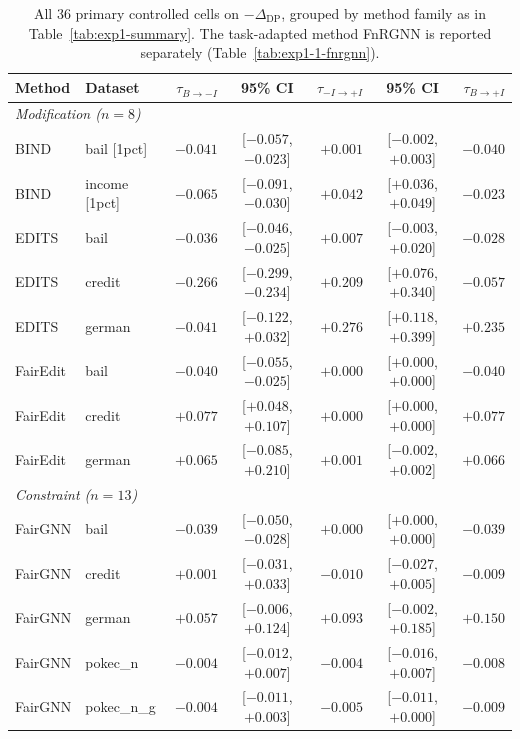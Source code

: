 \begin{table}[t]
\centering
\caption{All 36 primary controlled cells on $-\Delta_{\mathrm{DP}}$, grouped by method family as in Table~\ref{tab:exp1-summary}. The task-adapted method FnRGNN is reported separately (Table~\ref{tab:exp1-1-fnrgnn}).}
\label{tab:exp1-cells-negDP}
\scriptsize
\vspace{-0.2cm}
\begin{tabular}{llrcrcr}
\toprule
Method & Dataset & $\tau_{B\rightarrow -I}$ & 95\% CI & $\tau_{-I\rightarrow +I}$ & 95\% CI & $\tau_{B\rightarrow +I}$ \\
\midrule
\multicolumn{7}{l}{\textit{Modification ($n=8$)}} \\
BIND & bail [1pct] & $-0.041$ & [$-0.057$, $-0.023$] & $+0.001$ & [$-0.002$, $+0.003$] & $-0.040$ \\
BIND & income [1pct] & $-0.065$ & [$-0.091$, $-0.030$] & $\mathbf{+0.042}$ & [$+0.036$, $+0.049$] & $-0.023$ \\
\midrule
EDITS & bail & $-0.036$ & [$-0.046$, $-0.025$] & $+0.007$ & [$-0.003$, $+0.020$] & $-0.028$ \\
EDITS & credit & $-0.266$ & [$-0.299$, $-0.234$] & $\mathbf{+0.209}$ & [$+0.076$, $+0.340$] & $-0.057$ \\
EDITS & german & $-0.041$ & [$-0.122$, $+0.032$] & $\mathbf{+0.276}$ & [$+0.118$, $+0.399$] & $+0.235$ \\
\midrule
FairEdit & bail & $-0.040$ & [$-0.055$, $-0.025$] & $+0.000$ & [$+0.000$, $+0.000$] & $-0.040$ \\
FairEdit & credit & $+0.077$ & [$+0.048$, $+0.107$] & $+0.000$ & [$+0.000$, $+0.000$] & $+0.077$ \\
FairEdit & german & $+0.065$ & [$-0.085$, $+0.210$] & $+0.001$ & [$-0.002$, $+0.002$] & $+0.066$ \\
\midrule
\multicolumn{7}{l}{\textit{Constraint ($n=13$)}} \\
FairGNN & bail & $-0.039$ & [$-0.050$, $-0.028$] & $+0.000$ & [$+0.000$, $+0.000$] & $-0.039$ \\
FairGNN & credit & $+0.001$ & [$-0.031$, $+0.033$] & $-0.010$ & [$-0.027$, $+0.005$] & $-0.009$ \\
FairGNN & german & $+0.057$ & [$-0.006$, $+0.124$] & $+0.093$ & [$-0.002$, $+0.185$] & $+0.150$ \\
FairGNN & pokec\_n & $-0.004$ & [$-0.012$, $+0.007$] & $-0.004$ & [$-0.016$, $+0.007$] & $-0.008$ \\
FairGNN & pokec\_n\_g & $-0.004$ & [$-0.011$, $+0.003$] & $-0.005$ & [$-0.011$, $+0.000$] & $-0.009$ \\

\end{tabular}
\end{table}
